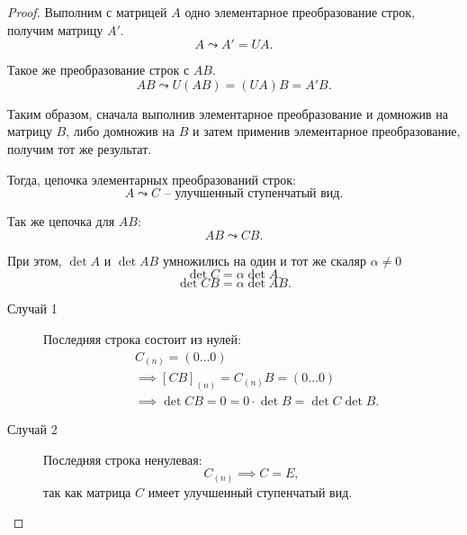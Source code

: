 \begin{proof}
    Выполним с матрицей $A$ одно элементарное преобразование строк, получим матрицу $A'$.
    \begin{equation*}
        A \leadsto A' = U A
    .\end{equation*}

    Такое же преобразование строк с $AB$.
    \begin{equation*}
        AB \leadsto U(AB) = (UA)B = A'B
    .\end{equation*}

    Таким образом, сначала выполнив элементарное преобразование и домножив на матрицу $B$, либо домножив на $B$ и затем применив элементарное преобразование, получим тот же результат.

    Тогда, цепочка элементарных преобразований строк:
    \begin{equation*}
        A \leadsto C \text{ -- улучшенный ступенчатый вид}
    .\end{equation*}

    Так же цепочка для $AB$:
    \begin{equation*}
        AB \leadsto CB
    .\end{equation*}

    При этом, $\det A$ и $\det AB$ умножились на один и тот же скаляр $\alpha \neq 0$
    \begin{equation*}
        \det C = \alpha \det A
    .\end{equation*}
    \begin{equation*}
        \det CB = \alpha \det AB
    .\end{equation*}

    \begin{description}
    \item[Случай 1]
        Последняя строка состоит из нулей:
        \begin{align*}
            &C_{(n)} = (0 \dots 0) \\
            &\implies [CB]_{(n)} = C_{(n)} B = (0 \dots 0) \\
            &\implies \det CB = 0 = 0 \cdot \det B = \det C \det B
        .\end{align*}

    \item[Случай 2]
        Последняя строка ненулевая:
        \begin{equation*}
            \tag{$star$}
            C_{(n)} \implies C = E
        ,\end{equation*}
        так как матрица $C$ имеет улучшенный ступенчатый вид.


\end{description}
\end{proof}

